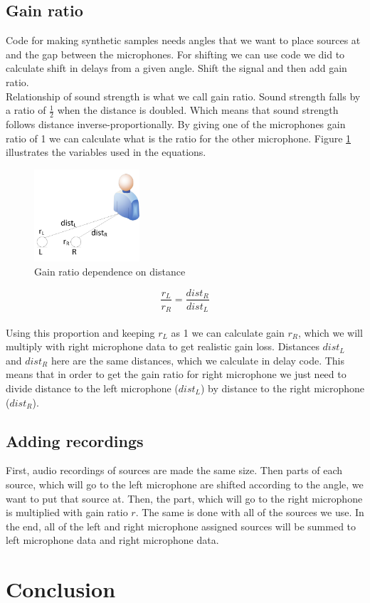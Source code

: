   \subsection{Gain ratio}
  Code for making synthetic samples needs angles that we want to place sources at and the gap between the 
microphones. For shifting we can use code we did to calculate shift in delays from a given angle. Shift the signal 
and then add gain ratio. \\
  Relationship of sound strength is what we call gain ratio. Sound strength falls by a ratio of \( \frac{1}{2}
\) when the distance is doubled. Which means that sound strength follows distance inverse-proportionally. 
  By giving one of the microphones gain ratio of 1 we can calculate what is the ratio for the other 
microphone. Figure \ref{fig:ratioDependence} illustrates the variables used in the equations.
\begin{figure}[htp]
	\centering
	\includegraphics[width=0.35\textwidth]{Illustrations/gainRatio.jpg}
	\caption{Gain ratio dependence on distance}
	\label{fig:ratioDependence}
\end{figure}
 \[\frac{r_L}{r_R} = \frac{dist_R}{dist_L} \]\\
Using this proportion and keeping \(r_L\) as 1 we can calculate gain \(r_R\), which we will multiply with 
right microphone data to get realistic gain loss. Distances \(dist_L\) and \(dist_R\) here are the same 
distances, which we calculate in delay code. This means that in order to get the gain ratio for right 
microphone we just need to divide distance to the left microphone (\(dist_L\)) by distance to the right 
microphone (\(dist_R\)).
\subsection{Adding recordings}
First, audio recordings of sources are made the same size. Then parts of each source, which will go to the left 
microphone are shifted according to the angle, we want to put that source at. Then, the part, which will go to the 
right microphone is multiplied with gain ratio \(r\). The same is done with all of the sources we use. In the end, 
all of the left and right microphone assigned sources will be summed to left microphone data and right microphone 
data. 


 

\section{Conclusion}